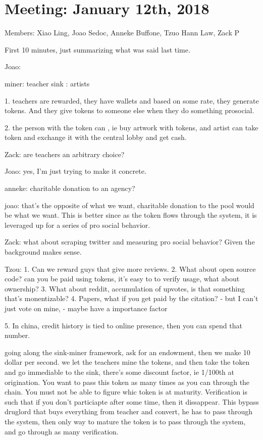 \section{Meeting: January 12th, 2018}

Members: Xiao Ling, Joao Sedoc, Anneke Buffone, Tzuo Hann Law, Zack P

First 10 minutes, just summarizing what was said last time.


Joao: 

miner: teacher
sink : artists

1. teachers are rewarded, they have wallets and based on some rate, they generate tokens. And they give tokens to someone else when they do something prosocial. 

2. the person with the token can , ie buy artwork with tokens, and artist can take token and exchange it with the central lobby and get cash. 

Zack: are teachers an arbitrary choice?

Joao: yes, I'm just trying to make it concrete. 

anneke: charitable donation to an agency?

joao: that's the opposite of what we want, charitable donation to the pool would be what we want. This is better since as the token flows through the system, it is leveraged up for a series of pro social behavior. 

Zack: what about scraping twitter and measuring pro social behavior? Given the background makes sense. 

Tzou: 
1. Can we reward guys that give more reviews. 
2. What about open source code? can you be paid using tokens, it's easy to to verify usage,   what about ownership? 
3. What about reddit, accumulation of upvotes, is that something that's monentizable?
4. Papers, what if you get paid by the citation?
	- but I can't just vote on mine, 
	- maybe have a importance factor

5. In china, credit history is tied to online presence, then you can spend that number. 

going along the sink-miner framework, ask for an endowment, then we make 10 dollar per second. we let the teachers mine the tokens, and then take the token and go immediable to the sink, there's some discount factor, ie 1/100th at origination. You want to pass this token as many times as you can through the chain. You must not be able to figure whic token is at maturity. Verification is such that if you don't particiapte after some time, then it dissappear. This bypass druglord that buys everything from teacher and convert, he has to pass through the system, then only way to mature the token is to pass through the system, and go through as many verification. 

